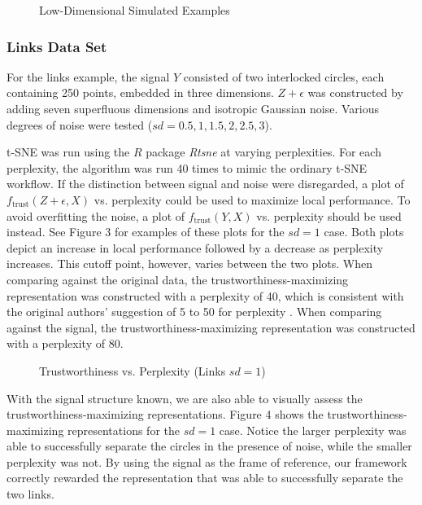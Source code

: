 \documentclass{article}
\begin{document}
\renewcommand{\thefigure}{2}
\begin{figure}[H]
\centering
\caption{Low-Dimensional Simulated Examples}
\end{figure}

\subsubsection{Links Data Set}
For the links example, the signal $Y$ consisted of two interlocked circles, each containing 250 points, embedded in three dimensions. $Z + \epsilon$ was constructed by adding seven superfluous dimensions and isotropic Gaussian noise. Various degrees of noise were tested ($sd = 0.5, 1, 1.5, 2, 2.5, 3$).

t-SNE was run using the $R$ package \textit{Rtsne} \cite{Rtsne} at varying perplexities. For each perplexity, the algorithm was run 40 times to mimic the ordinary t-SNE workflow. If the distinction between signal and noise were disregarded, a plot of $f_\textrm{trust}(Z + \epsilon, X)$ vs. perplexity could be used to maximize local performance. To avoid overfitting the noise, a plot of $f_\textrm{trust}(Y, X)$ vs. perplexity should be used instead. See Figure 3 for examples of these plots for the $sd = 1$ case. Both plots depict an increase in local performance followed by a decrease as perplexity increases. This cutoff point, however, varies between the two plots. When comparing against the original data, the trustworthiness-maximizing representation was constructed with a perplexity of 40, which is consistent with the original authors' suggestion of 5 to 50 for perplexity \cite{t-SNE}. When comparing against the signal, the trustworthiness-maximizing representation was constructed with a perplexity of 80.

\renewcommand{\thefigure}{3}
\begin{figure}[H]
\centering
\caption{Trustworthiness vs. Perplexity (Links $sd = 1$)}
\end{figure}

With the signal structure known, we are also able to visually assess the trustworthiness-maximizing representations. Figure 4 shows the trustworthiness-maximizing representations for the $sd = 1$ case. Notice the larger perplexity was able to successfully separate the circles in the presence of noise, while the smaller perplexity was not. By using the signal as the frame of reference, our framework correctly rewarded the representation that was able to successfully separate the two links.
\end{document}
